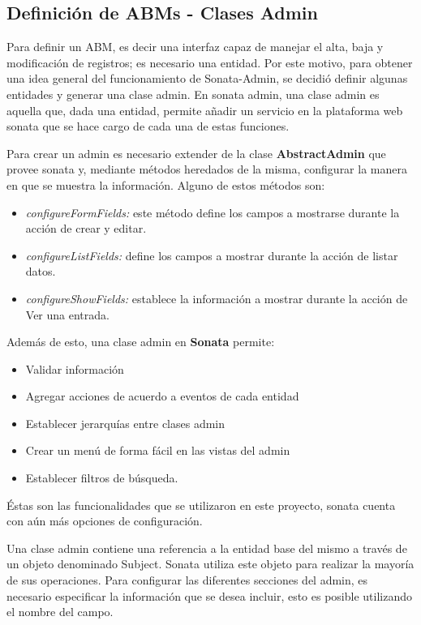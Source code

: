 
\subsection{Definición de ABMs - Clases Admin}%
\label{sub:definición_de_abms_clases_admin}

Para definir un ABM, es decir una interfaz capaz de manejar el alta, baja y modificación de registros; es necesario una entidad. Por este motivo, para obtener
una idea general del funcionamiento de Sonata-Admin, se decidió definir algunas entidades y generar una clase admin\@.
En sonata admin, una clase admin es aquella que, dada una entidad, permite añadir un servicio en la plataforma web sonata que se hace cargo de cada una de estas funciones.

Para crear un admin es necesario extender de la clase \textbf{AbstractAdmin} que provee sonata y, mediante métodos heredados de la misma, configurar la manera en
que se muestra la información\@.
Alguno de estos métodos son:

\begin{itemize}
    \item \textit{configureFormFields:} este método define los campos a mostrarse durante la acción de crear y editar.
    \item \textit{configureListFields:} define los campos a mostrar durante la acción de listar datos.
    \item \textit{configureShowFields:} establece la información a mostrar durante la acción de Ver una entrada.
\end{itemize}

\noindent
Además de esto, una clase admin en \textbf{Sonata} permite:
\begin{itemize}
    \item Validar información
    \item Agregar acciones de acuerdo a eventos de cada entidad
    \item Establecer jerarquías entre clases admin
    \item Crear un menú de forma fácil en las vistas del admin
    \item Establecer filtros de búsqueda.
\end{itemize}

Éstas son las funcionalidades que se utilizaron en este proyecto, sonata cuenta con aún más opciones de configuración.

Una clase admin contiene una referencia a la entidad base del mismo a través de un objeto denominado Subject. Sonata utiliza este objeto para realizar
la mayoría de sus operaciones.
Para configurar las diferentes secciones del admin, es necesario especificar la información que se desea incluir, esto es posible utilizando el nombre del campo.

